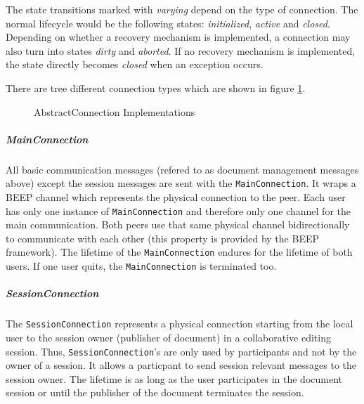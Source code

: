 The state transitions marked with \emph{varying} depend on the type of connection. The normal lifecycle would be the following states: \emph{initialized}, \emph{active} and \emph{closed}. Depending on whether a recovery mechanism is implemented, a connection may also turn into states \emph{dirty} and \emph{aborted}. If no recovery mechanism is implemented, the state directly becomes \emph{closed} when an exception occurs.

There are tree different connection types which are shown in figure \ref{fig:network.protocol.connection.uml}.

\begin{figure}[H]
 \centering
 \caption{AbstractConnection Implementations}
 \label{fig:network.protocol.connection.uml}
\end{figure}


\subparagraph{MainConnection}
All basic communication messages (refered to as document management messages above) except the session messages are sent with the \texttt{MainConnection}. It wraps a BEEP channel which represents the physical connection to the peer. Each user has only one instance of \texttt{MainConnection} and therefore only one channel for the main communication. Both peers use that same physical channel bidirectionally to communicate with each other (this property is provided by the BEEP framework). The lifetime of the \texttt{MainConnection} endures for the lifetime of both users. If one user quits, the \texttt{MainConnection} is terminated too.

\subparagraph{SessionConnection}
The \texttt{SessionConnection} represents a physical connection starting from the local user to the session owner (publisher of document) in a collaborative editing session. Thus, \texttt{SessionConnection}'s are only used by participants and not by the owner of a session. It allows a particpant to send session relevant messages to the session owner. The lifetime is as long as the user participates in the document session or until the publisher of the document terminates the session.


